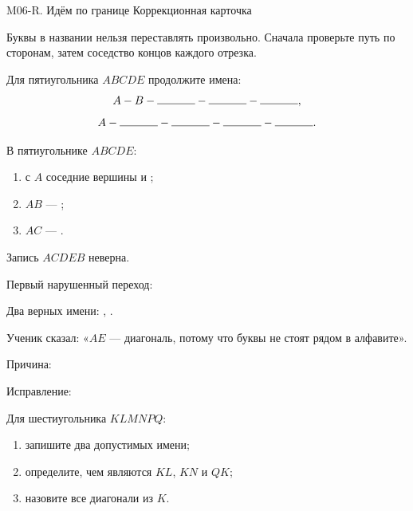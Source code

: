 \worksheettitle
  {M06-R. Идём по границе}
  { Коррекционная карточка}

\studentnameblock

\begin{warningbox}
  Буквы в названии нельзя переставлять произвольно. Сначала проверьте путь по
  сторонам, затем соседство концов каждого отрезка.
\end{warningbox}

\begin{practicebox}
  Для пятиугольника $ABCDE$ продолжите имена:
  \[
    A-B-\answerblank[12mm]-\answerblank[12mm]-\answerblank[12mm],
  \]
  \[
    A-\answerblank[12mm]-\answerblank[12mm]-\answerblank[12mm]
      -\answerblank[12mm].
  \]
\end{practicebox}

\begin{practicebox}
  В пятиугольнике $ABCDE$:
  \begin{enumerate}[label=\alph*)]
    \item с $A$ соседние вершины \answerblank[15mm] и \answerblank[15mm];
    \item $AB$ --- \answerblank[22mm];
    \item $AC$ --- \answerblank[22mm].
  \end{enumerate}
\end{practicebox}

\begin{practicebox}
  Запись $ACDEB$ неверна.

  Первый нарушенный переход: \answerblank[25mm]

  Два верных имени: \answerblank[42mm], \answerblank[42mm].
\end{practicebox}

\begin{practicebox}
  Ученик сказал: «$AE$ --- диагональ, потому что буквы не стоят рядом
  в алфавите».

  Причина: \answerblank[95mm]

  Исправление: \answerblank[95mm]
\end{practicebox}

\begin{checkpointbox}
  Для шестиугольника $KLMNPQ$:
  \begin{enumerate}[label=\textbf{\arabic*.}]
    \item запишите два допустимых имени;
    \item определите, чем являются $KL$, $KN$ и $QK$;
    \item назовите все диагонали из $K$.
  \end{enumerate}
\end{checkpointbox}
